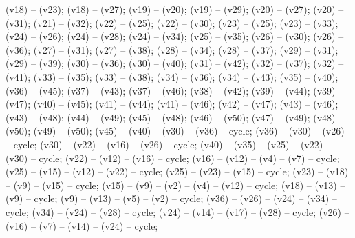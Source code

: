  (v18) -- (v23);
 (v18) -- (v27);
 (v19) -- (v20);
 (v19) -- (v29);
 (v20) -- (v27);
 (v20) -- (v31);
 (v21) -- (v32);
 (v22) -- (v25);
 (v22) -- (v30);
 (v23) -- (v25);
 (v23) -- (v33);
 (v24) -- (v26);
 (v24) -- (v28);
 (v24) -- (v34);
 (v25) -- (v35);
 (v26) -- (v30);
 (v26) -- (v36);
 (v27) -- (v31);
 (v27) -- (v38);
 (v28) -- (v34);
 (v28) -- (v37);
 (v29) -- (v31);
 (v29) -- (v39);
 (v30) -- (v36);
 (v30) -- (v40);
 (v31) -- (v42);
 (v32) -- (v37);
 (v32) -- (v41);
 (v33) -- (v35);
 (v33) -- (v38);
 (v34) -- (v36);
 (v34) -- (v43);
 (v35) -- (v40);
 (v36) -- (v45);
 (v37) -- (v43);
 (v37) -- (v46);
 (v38) -- (v42);
 (v39) -- (v44);
 (v39) -- (v47);
 (v40) -- (v45);
 (v41) -- (v44);
 (v41) -- (v46);
 (v42) -- (v47);
 (v43) -- (v46);
 (v43) -- (v48);
 (v44) -- (v49);
 (v45) -- (v48);
 (v46) -- (v50);
 (v47) -- (v49);
 (v48) -- (v50);
 (v49) -- (v50);
 (v45) -- (v40) -- (v30) -- (v36) -- cycle;
 (v36) -- (v30) -- (v26) -- cycle;
 (v30) -- (v22) -- (v16) -- (v26) -- cycle;
 (v40) -- (v35) -- (v25) -- (v22) -- (v30) -- cycle;
 (v22) -- (v12) -- (v16) -- cycle;
 (v16) -- (v12) -- (v4) -- (v7) -- cycle;
 (v25) -- (v15) -- (v12) -- (v22) -- cycle;
 (v25) -- (v23) -- (v15) -- cycle;
 (v23) -- (v18) -- (v9) -- (v15) -- cycle;
 (v15) -- (v9) -- (v2) -- (v4) -- (v12) -- cycle;
 (v18) -- (v13) -- (v9) -- cycle;
 (v9) -- (v13) -- (v5) -- (v2) -- cycle;
 (v36) -- (v26) -- (v24) -- (v34) -- cycle;
 (v34) -- (v24) -- (v28) -- cycle;
 (v24) -- (v14) -- (v17) -- (v28) -- cycle;
 (v26) -- (v16) -- (v7) -- (v14) -- (v24) -- cycle;
